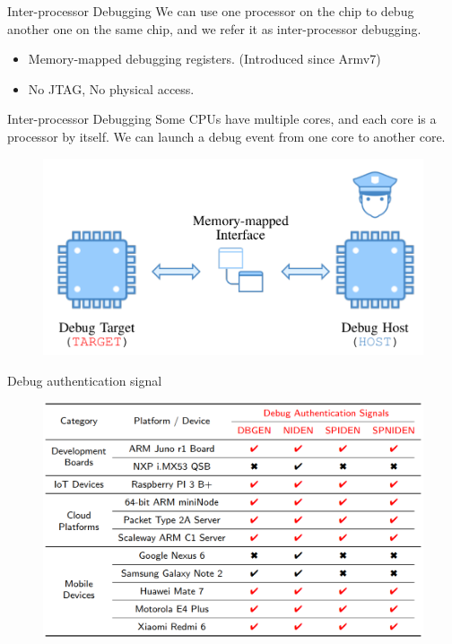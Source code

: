 \documentclass{beamer}
\begin{document}
\begin{frame}{Inter-processor Debugging}
    We can use one processor on the chip to debug another one on the same chip, and we refer it as inter-processor debugging.
    \begin{itemize}
        \item Memory-mapped debugging registers. (Introduced since Armv7)
        \item No JTAG, No physical access.
    \end{itemize}
\end{frame}

\begin{frame}{Inter-processor Debugging}
    Some CPUs have multiple cores, and each core is a processor by itself. We can launch a debug event from one core to another core.
    \begin{figure}
        \centering
        \includegraphics[scale=.40]{SUSTech-Beamer-Theme/pic/Inter-processor_debug.png}
        \label{fig:my_label}
    \end{figure}
\end{frame}

\begin{frame}{Debug authentication signal}
    \begin{figure}
        \centering
        \includegraphics[scale=.40]{SUSTech-Beamer-Theme/pic/signal_on_real.png}
        \label{fig:my_label}
    \end{figure}
\end{frame}
\end{document}
